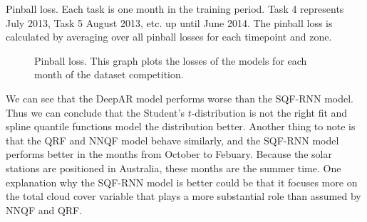 \begin{table}[ht]
    \caption[Pinball loss]{Pinball loss. 
    Each task is one month in the training period. 
    Task 4 represents July 2013, Task 5 August 2013, etc. up until June 2014.
    The pinball loss is calculated by averaging 
    over all pinball losses for each timepoint and zone.}
    \label{table:pinball-loss}
\end{table}

\begin{figure}[ht]
    \centering
    
    \caption[Pinball loss]{Pinball loss. 
    This graph plots the losses of the models for each month of the dataset competition.}
    \label{fig:pinball-loss}
\end{figure}

We can see that the DeepAR model performs worse than the SQF-RNN model. 
Thus we can conclude that the Student's \(t\)-distribution is not the right fit 
and spline quantile functions model the distribution better. 
Another thing to note is that the QRF and NNQF model behave similarly, 
and the SQF-RNN model performs better in the months from October to Febuary. 
Because the solar stations are positioned in Australia, these months are the summer time. 
One explanation why the SQF-RNN model is better could be that it focuses more on 
the total cloud cover variable that plays a more substantial role than assumed by 
NNQF and QRF.